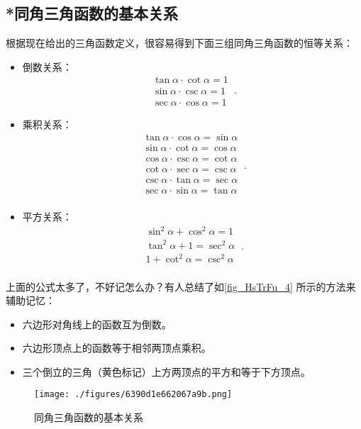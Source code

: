 \subsection{*同角三角函数的基本关系}

根据现在给出的三角函数定义，很容易得到下面三组同角三角函数的恒等关系：
\begin{itemize}
\item 倒数关系：
\begin{equation}\label{eq_HsTrFu_1}
\begin{split}
\tan \alpha \cdot \cot \alpha = 1\\
\sin \alpha \cdot  \csc \alpha = 1\\
\sec \alpha  \cdot \cos \alpha = 1
\end{split}~.
\end{equation}
\item 乘积关系：
\begin{equation}\label{eq_HsTrFu_2}
\begin{split}
\tan \alpha \cdot\cos \alpha= \sin \alpha\\
\sin \alpha \cdot\cot \alpha= \cos \alpha\\
\cos \alpha \cdot\csc \alpha= \cot \alpha\\
\cot \alpha \cdot\sec \alpha= \csc \alpha\\
\csc \alpha \cdot\tan \alpha= \sec \alpha\\
\sec \alpha \cdot\sin \alpha= \tan \alpha\\
\end{split}~.
\end{equation}
\item 平方关系：
\begin{equation}\label{eq_HsTrFu_3}
\begin{split}
\sin ^{2} \alpha + \cos ^{2}\alpha =1\\
\tan  ^{2} \alpha + 1 =\sec ^{2}\alpha\\
1 + \cot ^{2}\alpha =\csc ^{2}\alpha\\
\end{split}~.
\end{equation}
\end{itemize}
上面的公式太多了，不好记怎么办？有人总结了如\autoref{fig_HsTrFu_4} 所示的方法来辅助记忆：
\begin{itemize}
\item 六边形对角线上的函数互为倒数。
\item 六边形顶点上的函数等于相邻两顶点乘积。
\item 三个倒立的三角（黄色标记）上方两顶点的平方和等于下方顶点。
\end{itemize}
\begin{figure}[ht]
\centering
\texttt{[image: ./figures/6390d1e662067a9b.png]}
\caption{同角三角函数的基本关系} \label{fig_HsTrFu_4}
\end{figure}

